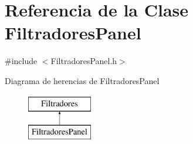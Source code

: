 \hypertarget{classFiltradoresPanel}{\section{\-Referencia de la \-Clase \-Filtradores\-Panel}
\label{classFiltradoresPanel}
}


{\ttfamily \#include $<$\-Filtradores\-Panel.\-h$>$}

\-Diagrama de herencias de \-Filtradores\-Panel\begin{figure}[H]
\begin{center}
\leavevmode
\includegraphics[height=2.000000cm]{classFiltradoresPanel}
\end{center}
\end{figure}
